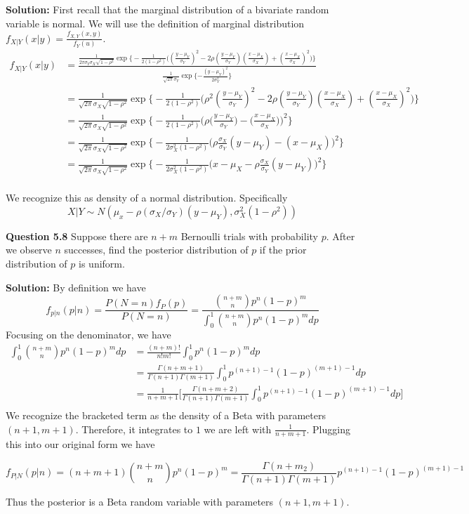 \documentclass[12pt]{article}  %
\begin{document}
\textbf{Solution:} First recall that the marginal distribution of a bivariate random variable is normal. We will use the definition of marginal distribution $f_{X|Y}(x|y) = \frac{f_{X,Y}(x,y)}{f_{Y}(u)}$.  
 \begin{align*}
 f_{X|Y}(x|y) &= \frac{\frac{1}{2\pi\sigma_Y\sigma_X\sqrt{1-\rho^2}}\exp\Big\{-\frac{1}{2(1-\rho^2)}\Big((\frac{y-\mu_Y}{\sigma_Y})^2-2\rho(\frac{y-\mu_Y}{\sigma_Y})(\frac{x-\mu_X}{\sigma_X}) + (\frac{x-\mu_X}{\sigma_X})^2\Big)\Big\}}{\frac{1}{\sqrt{2\pi}\sigma_Y}\exp\{-\frac{(y-\mu_Y)^2}{2\sigma_Y^2}\}}\\
 &= \frac{1}{\sqrt{2\pi}\sigma_X\sqrt{1-\rho^2}}\exp\Big\{-\frac{1}{2(1-\rho^2)}\Big(\rho^2(\frac{y-\mu_Y}{\sigma_Y})^2-2\rho(\frac{y-\mu_Y}{\sigma_Y})(\frac{x-\mu_X}{\sigma_X}) + (\frac{x-\mu_X}{\sigma_X})^2\Big)\Big\}\\
 &=\frac{1}{\sqrt{2\pi}\sigma_X\sqrt{1-\rho^2}}\exp\Big\{-\frac{1}{2(1-\rho^2)}\Big(\rho\big(\frac{y-\mu_Y}{\sigma_Y}\big) -\big(\frac{x-\mu_X}{\sigma_X}\big)\Big)^2\Big\}\\
 &= \frac{1}{\sqrt{2\pi}\sigma_X\sqrt{1-\rho^2}}\exp\Big\{-\frac{1}{2\sigma_X^2(1-\rho^2)}\Big(\rho\frac{\sigma_X}{\sigma_Y}(y-\mu_Y) - (x-\mu_X)\Big)^2\Big\}\\
&= \frac{1}{\sqrt{2\pi}\sigma_X\sqrt{1-\rho^2}}\exp\Big\{-\frac{1}{2\sigma_X^2(1-\rho^2)}\Big(x-\mu_X - \rho\frac{\sigma_X}{\sigma_Y}(y-\mu_Y)\Big)^2\Big\}\\
\end{align*}

We recognize this as density of a normal distribution. Specifically $$X|Y \sim N\left(\mu_x-\rho(\sigma_X/\sigma_Y)(y-\mu_Y), \sigma_X^2(1-\rho^2)\right)$$

\newpage

\textbf{Question 5.8} Suppose there are $n + m$ Bernoulli trials with probability $p$. After we observe $n$ successes, find the posterior distribution of $p$ if the prior distribution of $p$ is uniform.

\textbf{Solution:} By definition we have $$f_{p|n}(p|n) =\frac{P(N=n)f_P(p)}{P(N=n)}
= \frac{\binom{n+m}{n}p^n(1-p)^{m}}{\int_{0}^{1}\binom{n+m}{n}p^n(1-p)^{m}dp}$$ Focusing on the denominator, we have 
\begin{align*}
\int_{0}^{1}\binom{n+m}{n}p^n(1-p)^{m}dp&= \frac{(n+m)!}{n!m!}\int_{0}^{1}p^n(1-p)^{m}dp\\
&= \frac{\Gamma(n + m + 1)}{\Gamma(n+1)\Gamma(m+1)}\int_{0}^{1}p^{(n+1)-1}(1-p)^{(m+1)-1}dp\\
&= \frac{1}{n+m+1}\Bigg[\frac{\Gamma(n + m + 2)}{\Gamma(n+1)\Gamma(m+1)}\int_{0}^{1}p^{(n+1)-1}(1-p)^{(m+1)-1}dp\Bigg]\\
\end{align*}
We recognize the bracketed term as the density of a Beta with parameters $(n+1, m+1)$. Therefore, it integrates to $1$ we are left with $\frac{1}{n+m+1}$. Plugging this into our original form we have 

$$f_{P|N}(p|n) = (n+m+1)\binom{n+m}{n}p^n(1-p)^{m} = \frac{\Gamma(n+m_2)}{\Gamma(n+1)\Gamma(m+1)}p^{(n+1)-1}(1-p)^{(m+1)-1}$$

Thus the posterior is a Beta random variable with parameters $(n+1, m+1)$. 
\end{document}
